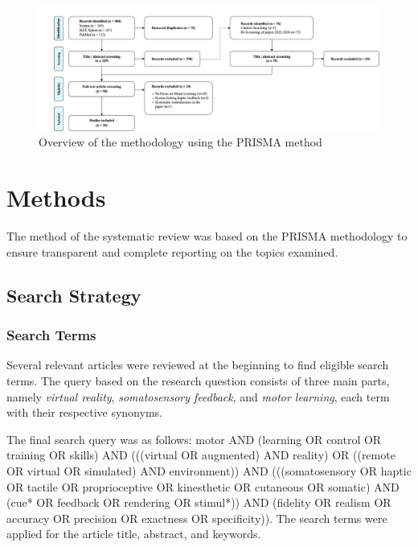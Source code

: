 
\begin{figure}[htbp]
    \centering
    \includegraphics[width=\linewidth]{figures/prisma_overview.png} 
    \caption{Overview of the methodology using the PRISMA method}
    \label{fig:prisma}
\end{figure} 

\section{Methods}
\label{sec:methods}

The method of the systematic review was based on the PRISMA methodology \cite{Page2021TheReviews} to ensure transparent and complete reporting on the topics examined.

\subsection{Search Strategy}

\subsubsection{Search Terms}
Several relevant articles were reviewed at the beginning to find eligible search terms. The query based on the research question consists of three main parts, namely \textit{virtual reality}, \textit{somatosensory feedback}, and \textit{motor learning}, each term with their respective synonyms. 

The final search query was as follows: motor AND (learning OR control OR training OR skills) AND (((virtual OR augmented) AND reality) OR ((remote OR virtual OR simulated) AND environment)) AND (((somatosensory OR haptic OR tactile OR proprioceptive OR kinesthetic OR cutaneous OR somatic) AND 
(cue* OR feedback OR rendering OR stimul*)) AND (fidelity OR realism OR accuracy OR precision OR exactness OR specificity)). The search terms were applied for the article title, abstract, and keywords.

